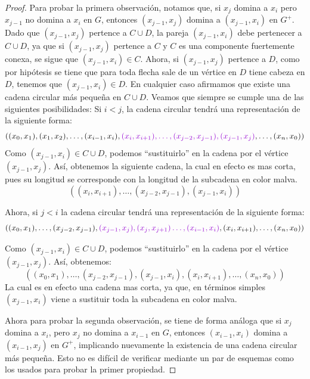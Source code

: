 \begin{proof}
Para probar la primera observaci\'on, notamos que, si $x_j$ domina a $x_i$ pero
$x_{j-1}$ no domina a $x_i$ en $G$, entonces $(x_{j-1},x_j)$ domina a
$(x_{j-1},x_i)$ en $G^+$. Dado que $(x_{j-1},x_j)$ pertence a $C\cup D$, la
pareja $(x_{j-1},x_i) $ debe pertenecer a $C\cup D$, ya que si $(x_{j-1},x_j)$
pertence a $C$ y $C$ es una componente fuertemente conexa, se sigue que
$(x_{j-1},x_i)\in C$. Ahora, si $(x_{j-1},x_j)$ pertence a $D$, como por
hip\'otesis se tiene que para toda flecha sale de un v\'ertice en $D$ tiene
cabeza en $D$, tenemos que $(x_{j-1},x_i)\in D$. En cualquier caso afirmamos que
existe una cadena circular m\'as pequeña en $C \cup D$. Veamos que siempre se
cumple una de las siguientes posibilidades: Si $i<j$, la cadena circular
tendr\'a una representaci\'on de la siguiente forma:
\[
  ( (x_0,x_1),(x_1,x_2),\dots, (x_{i-1},x_i), {\color{malva}(x_i,x_{i+1}),\dots,
  (x_{j-2},x_{j-1}),(x_{j-1},x_{j})}, \dots , (x_n,x_0))
\]
Como $(x_{j-1},x_i) \in C\cup D$, podemos ``sustituirlo'' en la cadena por el
v\'ertice $(x_{j-1},x_{j})$. Así, obtenemos la siguiente cadena, la cual en
efecto es mas corta, pues su longitud se corresponde con la longitud de la
subcadena en color malva.
\[
  ((x_i,x_{i+1}),\dots, (x_{j-2},x_{j-1}),(x_{j-1},x_i))
\]

Ahora, si $j<i$ la cadena circular tendr\'a una representaci\'on de la siguiente
forma:
$$( (x_0,x_1),\dots, (x_{j-2},x_{j-1}), {\color{malva}(x_{j-1},x_j),(x_j,x_{j+1}) \dots, (x_{i-1},x_{i})},(x_{i},x_{i+1}), \dots , (x_n,x_0))$$

Como $(x_{j-1},x_i) \in C \cup D$, podemos ``sustituirlo'' en la cadena por el
v\'ertice $(x_{j-1},x_{j})$. Así, obtenemos:
$$( (x_0,x_1),\dots, (x_{j-2},x_{j-1}), (x_{j-1},x_i),(x_{i},x_{i+1}), \dots ,
(x_n,x_0))$$ La cual es en efecto una cadena mas corta, ya que, en t\'erminos
simples $(x_{j-1},x_i)$ viene a sustituir toda la subcadena en color malva.

Ahora para probar la segunda observaci\'on, se tiene de forma an\'aloga que si
$x_j$ domina a $x_i$, pero $x_j$ no domina a $x_{i-1}$ en $G$, entonces
$(x_{i-1}, x_i)$ domina a $(x_{i-1}, x_j)$ en $G^+$, implicando nuevamente la
existencia de una cadena circular m\'as pequeña. Esto no es dif\'icil de
verificar mediante un par de esquemas como los usados para probar la primer
propiedad.



\end{proof}
